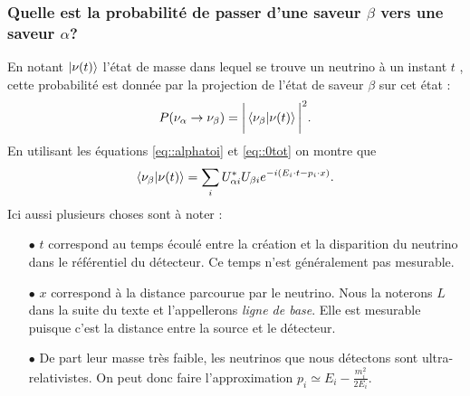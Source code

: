            \subsubsection{Quelle est la probabilité de passer d'une saveur $\beta$ vers une saveur $\alpha$?}\label{sec::proba_oscillations}
            En notant $\ket{\nu(t)}$ l'état de masse dans lequel se trouve un neutrino à un instant $t$ , cette probabilité est donnée par la projection de l'état de saveur $\beta$ sur cet état :
            \begin{equation}
                P(\nu_{\alpha}\to\nu_{\beta})=\bigg|\braket{\nu_{\beta}}{\nu(t)}\bigg|^2.
            \end{equation}
            En utilisant les équations \eqref{eq::alphatoi} et \eqref{eq::0tot} on montre que
            \begin{equation}
                \braket{\nu_{\beta}}{\nu(t)} = \sum_i U_{\alpha i}^*U_{\beta i} e^{-i(E_i\cdot t - p_i\cdot x)}.
            \end{equation}
            Ici aussi plusieurs choses sont à noter : 
            \begin{itemize}
                \item[$\bullet$] $t$ correspond au temps écoulé entre la création et la disparition du neutrino dans le référentiel du détecteur. Ce temps n'est généralement pas mesurable.%
                \item[$\bullet$] $x$ correspond à la distance parcourue par le neutrino. Nous la noterons $L$ dans la suite du texte et l'appellerons \textit{ligne de base}. Elle est mesurable puisque c'est la distance entre la source et le détecteur.
                \item[$\bullet$] De part leur masse très faible, les neutrinos que nous détectons sont ultra-relativistes. On peut donc faire l'approximation $p_i \simeq E_i - \frac{m_i^2}{2E_i}$.
            \end{itemize}
            
